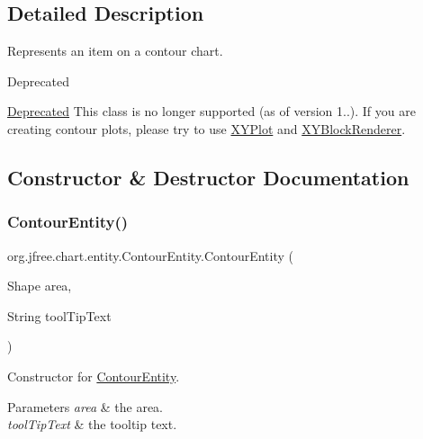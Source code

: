 \subsection{Detailed Description}
Represents an item on a contour chart.

\begin{DoxyRefDesc}{Deprecated}
\item[\mbox{\hyperlink{deprecated__deprecated000047}{Deprecated}}]This class is no longer supported (as of version 1..). If you are creating contour plots, please try to use \mbox{\hyperlink{}{X\+Y\+Plot}} and \mbox{\hyperlink{}{X\+Y\+Block\+Renderer}}. \end{DoxyRefDesc}


\subsection{Constructor \& Destructor Documentation}
\mbox{\label{classorg_1_1jfree_1_1chart_1_1entity_1_1_contour_entity_a43fc67a1711a5a4b83494ed4352618e7}} 
\subsubsection{\texorpdfstring{Contour\+Entity()}{ContourEntity()}\hspace{0.1cm}{\footnotesize\ttfamily [1/2]}}
{\footnotesize\ttfamily org.\+jfree.\+chart.\+entity.\+Contour\+Entity.\+Contour\+Entity (\begin{DoxyParamCaption}\item[{Shape}]{area,  }\item[{String}]{tool\+Tip\+Text }\end{DoxyParamCaption})}

Constructor for \mbox{\hyperlink{classorg_1_1jfree_1_1chart_1_1entity_1_1_contour_entity}{Contour\+Entity}}.


\begin{DoxyParams}{Parameters}
{\em area} & the area. \\
\hline
{\em tool\+Tip\+Text} & the tooltip text. \\
\hline
\end{DoxyParams}
\mbox{\label{classorg_1_1jfree_1_1chart_1_1entity_1_1_contour_entity_ac4d377748f6cfa0750d76851192e0336}} 
